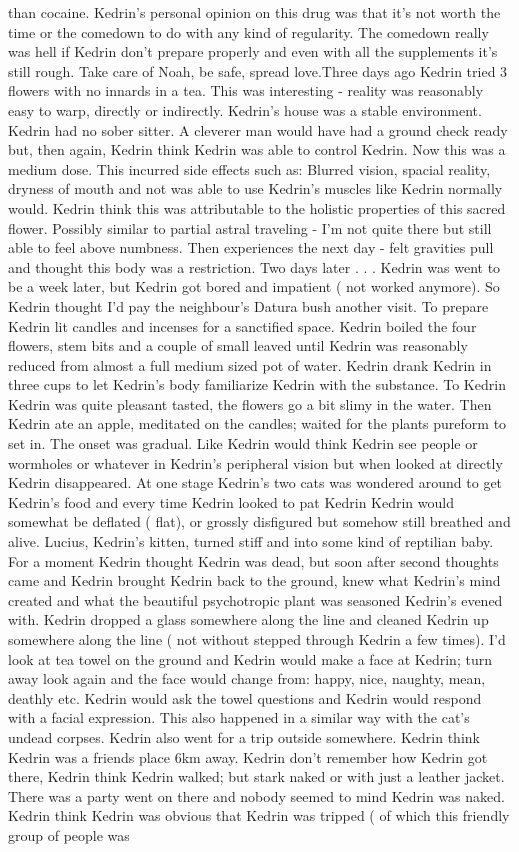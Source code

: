 \documentclass[12pt]{book}
\begin{document}
than cocaine. Kedrin's personal opinion on this drug was that it's not worth the time or the comedown to do with any kind of regularity. The comedown really was hell if Kedrin don't prepare properly and even with all the supplements it's still rough. Take care of Noah, be safe, spread love.Three days ago Kedrin tried 3 flowers with no innards in a tea. This was interesting - reality was reasonably easy to warp, directly or indirectly. Kedrin's house was a stable environment. Kedrin had no sober sitter. A cleverer man would have had a ground check ready but, then again, Kedrin think Kedrin was able to control Kedrin. Now this was a medium dose. This incurred side effects such as: Blurred vision, spacial reality, dryness of mouth and not was able to use Kedrin's muscles like Kedrin normally would. Kedrin think this was attributable to the holistic properties of this sacred flower. Possibly similar to partial astral traveling - I'm not quite there but still able to feel above numbness. Then experiences the next day - felt gravities pull and thought this body was a restriction. Two days later . . .  Kedrin was went to be a week later, but Kedrin got bored and impatient ( not worked anymore). So Kedrin thought I'd pay the neighbour's Datura bush another visit. To prepare Kedrin lit candles and incenses for a sanctified space. Kedrin boiled the four flowers, stem bits and a couple of small leaved until Kedrin was reasonably reduced from almost a full medium sized pot of water. Kedrin drank Kedrin in three cups to let Kedrin's body familiarize Kedrin with the substance. To Kedrin Kedrin was quite pleasant tasted, the flowers go a bit slimy in the water. Then Kedrin ate an apple, meditated on the candles; waited for the plants pureform to set in. The onset was gradual. Like Kedrin would think Kedrin see people or wormholes or whatever in Kedrin's peripheral vision but when looked at directly Kedrin disappeared. At one stage Kedrin's two cats was wondered around to get Kedrin's food and every time Kedrin looked to pat Kedrin Kedrin would somewhat be deflated ( flat), or grossly disfigured but somehow still breathed and alive. Lucius, Kedrin's kitten, turned stiff and into some kind of reptilian baby. For a moment Kedrin thought Kedrin was dead, but soon after second thoughts came and Kedrin brought Kedrin back to the ground, knew what Kedrin's mind created and what the beautiful psychotropic plant was seasoned Kedrin's evened with. Kedrin dropped a glass somewhere along the line and cleaned Kedrin up somewhere along the line ( not without stepped through Kedrin a few times). I'd look at tea towel on the ground and Kedrin would make a face at Kedrin; turn away look again and the face would change from: happy, nice, naughty, mean, deathly etc. Kedrin would ask the towel questions and Kedrin would respond with a facial expression. This also happened in a similar way with the cat's undead corpses. Kedrin also went for a trip outside somewhere. Kedrin think Kedrin was a friends place 6km away. Kedrin don't remember how Kedrin got there, Kedrin think Kedrin walked; but stark naked or with just a leather jacket. There was a party went on there and nobody seemed to mind Kedrin was naked. Kedrin think Kedrin was obvious that Kedrin was tripped ( of which this friendly group of people was 
\end{document}
